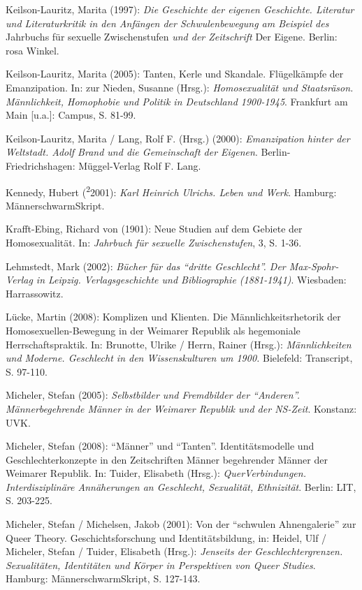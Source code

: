 \documentclass[a4paper,
fontsize=11pt,
oneside,
numbers=noperiodatend,
parskip=half-,
bibliography=totoc,
final
]{scrartcl}
\begin{document}
Keilson-Lauritz, Marita (1997): \emph{Die Geschichte der eigenen
Geschichte. Literatur und Literaturkritik in den Anfängen der
Schwulenbewegung am Beispiel des} Jahrbuchs für sexuelle Zwischenstufen
\emph{und der Zeitschrift} Der Eigene. Berlin: rosa Winkel.

Keilson-Lauritz, Marita (2005): Tanten, Kerle und Skandale. Flügelkämpfe
der Emanzipation. In: zur Nieden, Susanne (Hrsg.): \emph{Homosexualität
und Staatsräson. Männlichkeit, Homophobie und Politik in Deutschland
1900-1945}. Frankfurt am Main {[}u.a.{]}: Campus, S. 81-99.

Keilson-Lauritz, Marita / Lang, Rolf F. (Hrsg.) (2000):
\emph{Emanzipation hinter der Weltstadt. Adolf Brand und die
Gemeinschaft der Eigenen}. Berlin-Friedrichshagen: Müggel-Verlag Rolf F.
Lang.

Kennedy, Hubert (\textsuperscript{2}2001): \emph{Karl Heinrich Ulrichs.
Leben und Werk}. Hamburg: MännerschwarmSkript.

Krafft-Ebing, Richard von (1901): Neue Studien auf dem Gebiete der
Homosexualität. In: \emph{Jahrbuch für sexuelle Zwischenstufen}, 3, S.
1-36.

Lehmstedt, Mark (2002): \emph{Bücher für das \enquote{dritte
Geschlecht}. Der Max-Spohr-Verlag in Leipzig. Verlagsgeschichte und
Bibliographie (1881-1941)}. Wiesbaden: Harrassowitz.

Lücke, Martin (2008): Komplizen und Klienten. Die Männlichkeitsrhetorik
der Homosexuellen-Bewegung in der Weimarer Republik als hegemoniale
Herrschaftspraktik. In: Brunotte, Ulrike / Herrn, Rainer (Hrsg.):
\emph{Männlichkeiten und Moderne. Geschlecht in den Wissenskulturen um
1900.} Bielefeld: Transcript, S. 97-110.

Micheler, Stefan (2005): \emph{Selbstbilder und Fremdbilder der
\enquote{Anderen}. Männerbegehrende Männer in der Weimarer Republik und
der NS-Zeit}. Konstanz: UVK.

Micheler, Stefan (2008): \enquote{Männer} und \enquote{Tanten}.
Identitätsmodelle und Geschlechterkonzepte in den Zeitschriften Männer
begehrender Männer der Weimarer Republik. In: Tuider, Elisabeth (Hrsg.):
\emph{QuerVerbindungen. Interdisziplinäre Annäherungen an Geschlecht,
Sexualität, Ethnizität}. Berlin: LIT, S. 203-225.

Micheler, Stefan / Michelsen, Jakob (2001): Von der \enquote{schwulen
Ahnengalerie} zur Queer Theory. Geschichtsforschung und
Identitätsbildung, in: Heidel, Ulf / Micheler, Stefan / Tuider,
Elisabeth (Hrsg.): \emph{Jenseits der Geschlechtergrenzen. Sexualitäten,
Identitäten und Körper in Perspektiven von Queer Studies}. Hamburg:
MännerschwarmSkript, S. 127-143.
\end{document}
